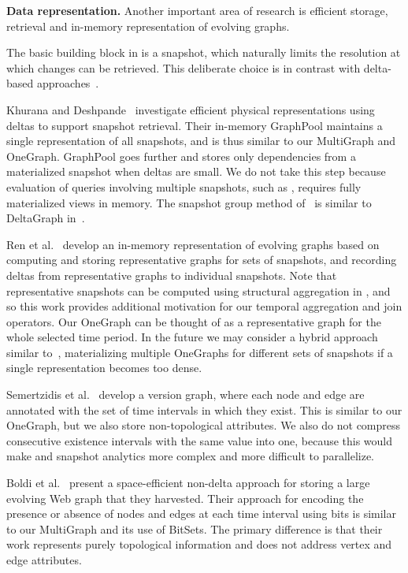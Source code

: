 
{\bf Data representation.}  Another important area of research is
efficient storage, retrieval and in-memory representation of evolving
graphs.  

The basic building block in \ql is a snapshot, which naturally limits
the resolution at which changes can be retrieved. This deliberate
choice is in contrast with delta-based
approaches~\cite{Khurana2013,Koloniari2012,DBLP:journals/tos/MiaoHLWYZPCC15}.

Khurana and Deshpande~\cite{Khurana2013} investigate efficient
physical representations using deltas to support snapshot retrieval.
Their in-memory GraphPool maintains a single representation of all
snapshots, and is thus similar to our MultiGraph and OneGraph.
GraphPool goes further and stores only dependencies from a
materialized snapshot when deltas are small.  We do not take
this step because evaluation of queries involving multiple snapshots,
such as , requires fully materialized views in memory.
The snapshot group method of~\cite{DBLP:journals/tos/MiaoHLWYZPCC15}
is similar to DeltaGraph in~\cite{Khurana2013}.

Ren et al.~\cite{Ren2011} develop an in-memory representation of
evolving graphs based on computing and storing representative graphs
for sets of snapshots, and recording deltas from representative graphs
to individual snapshots.  Note that representative snapshots can be
computed using structural aggregation in \ql, and so this work
provides additional motivation for our temporal aggregation and join
operators.  Our OneGraph can be thought of as a representative graph
for the whole selected time period.  In the future we may consider a
hybrid approach similar to~\cite{Ren2011}, materializing multiple
OneGraphs for different sets of snapshots if a single representation
becomes too dense.

Semertzidis et al.~\cite{Semertzidis2015} develop a version graph,
where each node and edge are annotated with the set of time intervals
in which they exist.  This is similar to our OneGraph, but we also
store non-topological attributes.  We also do not compress consecutive
existence intervals with the same value into one, because this would
make  and snapshot analytics more complex and more
difficult to parallelize.

Boldi et al.~\cite{Boldi2008} present a space-efficient non-delta
approach for storing a large evolving Web graph that they harvested.
Their approach for encoding the presence or absence of nodes and edges
at each time interval using bits is similar to our MultiGraph and its
use of BitSets.  The primary difference is that their work represents
purely topological information and does not address vertex and edge
attributes.

